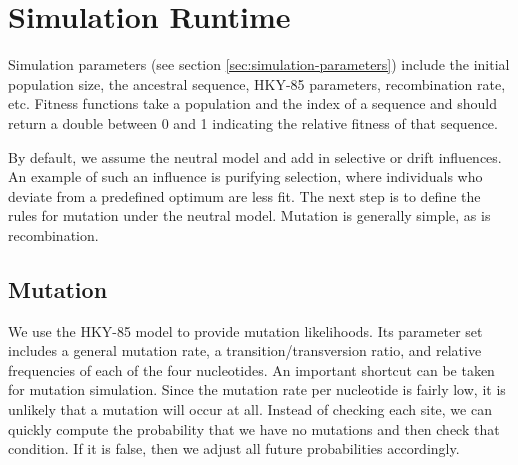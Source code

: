\documentclass{article}
\begin{document}
  \section{Simulation Runtime}

    Simulation parameters (see section \ref{sec:simulation-parameters}) include
    the initial population size, the ancestral sequence, HKY-85 parameters,
    recombination rate, etc. Fitness functions take a population and the index
    of a sequence and should return a double between 0 and 1 indicating the
    relative fitness of that sequence.

    By default, we assume the neutral model and add in selective or drift
    influences. An example of such an influence is purifying selection, where
    individuals who deviate from a predefined optimum are less fit. The next
    step is to define the rules for mutation under the neutral model.  Mutation
    is generally simple, as is recombination.
    
    \subsection{Mutation}
    
      We use the HKY-85 model to provide mutation likelihoods. Its parameter set
      includes a general mutation rate, a transition/transversion ratio, and
      relative frequencies of each of the four nucleotides. An important
      shortcut can be taken for mutation simulation. Since the mutation rate per
      nucleotide is fairly low, it is unlikely that a mutation will occur at
      all. Instead of checking each site, we can quickly compute the probability
      that we have no mutations and then check that condition. If it is false,
      then we adjust all future probabilities accordingly.
\end{document}
